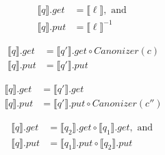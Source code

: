 \documentclass{svproc}
\newcommand{\canonizer}{\ensuremath{\mathit{Canonizer}}}
\begin{document}
\begin{figure}[t]
  \centering
  \begin{prooftree}
  \end{prooftree}
  \begin{align*}
    \llbracket q \rrbracket.get &=  \llbracket \ell \rrbracket, \text{ and }\\
    \llbracket q \rrbracket.put &= \llbracket \ell \rrbracket^{-1}
  \end{align*}
  
  \begin{prooftree}
  \end{prooftree}
  \begin{align*}
    \llbracket q \rrbracket.get  &= \llbracket q'
                                   \rrbracket.get \circ \canonizer(c)\\
    \llbracket q \rrbracket.put &= \llbracket q' \rrbracket.put
  \end{align*}

  \begin{prooftree}
    
  \end{prooftree}
  \begin{align*}
    \llbracket q \rrbracket.get &= \llbracket q'
                                  \rrbracket.get\\
    \llbracket q \rrbracket.put &= \llbracket q'
                                  \rrbracket.put \circ \canonizer(c'')
  \end{align*}
  
  \begin{prooftree}
  \end{prooftree}
  \begin{align*}
    \llbracket q \rrbracket.get &= \llbracket q_2 \rrbracket.get\circ \llbracket
                                  q_1 \rrbracket.get, \text{ and }\\
    \llbracket q \rrbracket.put &= \llbracket q_1 \rrbracket.put \circ \llbracket
                                  q_2 \rrbracket.put
  \end{align*}


\end{figure}
\end{document}
